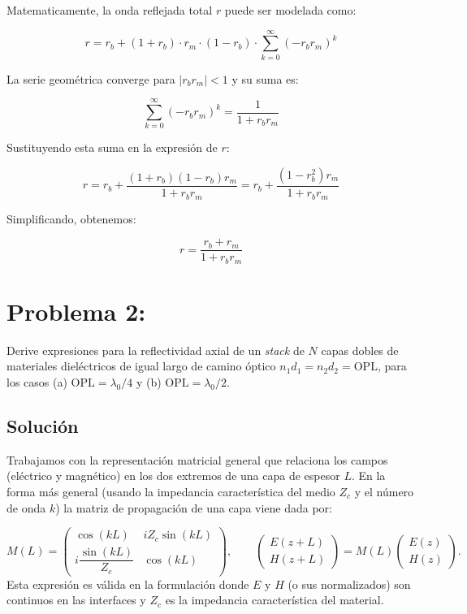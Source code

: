 \documentclass[11pt]{article}
\begin{document}
Matematicamente, la onda reflejada total \(r\) puede ser modelada como:

\[
r = r_b + (1 + r_b) \cdot r_m \cdot (1 - r_b) \cdot \sum_{k=0}^{\infty} (-r_b r_m)^{k}
\]

La serie geométrica converge para \(|r_b r_m| < 1\) y su suma es:

\[
\sum_{k=0}^{\infty} (-r_b r_m)^{k} = \frac{1}{1 + r_b r_m}
\]

Sustituyendo esta suma en la expresión de \(r\):

\[
r = r_b + \frac{(1 + r_b)(1 - r_b) r_m}{1 + r_b r_m} = r_b + \frac{(1 - r_b^2) r_m}{1 + r_b r_m}
\]

Simplificando, obtenemos:

\[
r = \frac{r_b + r_m}{1 + r_b r_m}
\]

\section*{Problema 2:}

Derive expresiones para la reflectividad axial de un \emph{stack} de \(N\) capas dobles de materiales dieléctricos de igual largo de camino óptico \(n_1 d_1 = n_2 d_2 = \mathrm{OPL}\), para los casos (a) \(\mathrm{OPL} = \lambda_0/4\) y (b) \(\mathrm{OPL} = \lambda_0/2\).
\vspace{0.5em}

\subsection*{Solución}

Trabajamos con la representación matricial general que relaciona los campos (eléctrico y magnético) en los dos extremos de una capa de espesor \(L\). En la forma más general (usando la impedancia característica del medio \(Z_c\) y el número de onda \(k\)) la matriz de propagación de una capa viene dada por:

\[
M(L) =
\begin{pmatrix}
\cos(kL) & i Z_c \sin(kL) \\[6pt]
i \dfrac{\sin(kL)}{Z_c} & \cos(kL)
\end{pmatrix},
\qquad
\begin{pmatrix} E(z+L) \\ H(z+L) \end{pmatrix} = M(L)\begin{pmatrix} E(z) \\ H(z) \end{pmatrix}.
\tag{1}
\]
Esta expresión es válida en la formulación donde \(E\) y \(H\) (o sus normalizados) son continuos en las interfaces y \(Z_c\) es la impedancia característica del material.
\end{document}

